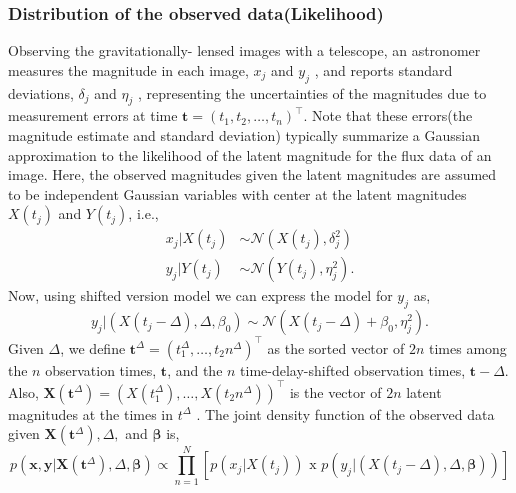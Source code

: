 \documentclass{article}
\begin{document}
\subsubsection*{Distribution of the observed data(Likelihood)}
Observing the gravitationally-
lensed images with a telescope, an astronomer measures the magnitude in
each image, $x_j$ and $y_j$ , and reports standard deviations, $\delta_j$ and $\eta_j$ , representing the uncertainties of the magnitudes due to measurement errors at time $\boldsymbol{t} = (t_1 , t_2, \ldots, t_n)^\top$. Note that these errors(the magnitude estimate and standard deviation) typically summarize a Gaussian approximation to the likelihood of the latent magnitude for the flux data of an image. Here, the observed magnitudes given the latent magnitudes are
assumed to be independent Gaussian variables with center at the latent magnitudes $X(t_j)$ and $Y (t_j )$, i.e.,
\begin{align*}
    x_j|X(t_j) & \sim \mathcal{N}(X(t_j),\delta_j^2)\\
    y_j|Y(t_j) & \sim \mathcal{N}(Y(t_j),\eta_j^2).
\end{align*}
Now, using shifted version model we can express the model for $y_j$ as,
\begin{equation*}
    y_j|(X(t_j-\Delta),\Delta,\beta_0) \sim \mathcal{N}(X(t_j-\Delta)+\beta_0,\eta_j^2).
\end{equation*}
Given $\Delta$, we define $\boldsymbol{t}^{\Delta} = (t_1^{\Delta},\ldots,t_2n^{\Delta})^\top$
 as the sorted vector of $2n$ times
among the $n$ observation times, $\boldsymbol{t}$, and the $n$ time-delay-shifted observation
times, $\boldsymbol{t} - \Delta$. Also, $\mathbf{X}(\boldsymbol{t}^{\Delta}) = (X(t_1^{\Delta}),\ldots, X(t_2n^{\Delta}))^\top$
 is the vector of
$2n$ latent magnitudes at the times in $t^{\Delta}$
. The joint density function of the
observed data given $\mathbf{X}(\boldsymbol{t}^{\Delta}), \Delta,$ and $\boldsymbol{\beta}$ is,
\begin{equation*}
    p(\boldsymbol{x},\boldsymbol{y}|\mathbf{X}(\boldsymbol{t}^{\Delta}), \Delta,\boldsymbol{\beta}) \propto \prod_{n=1}^N \left[p(x_j|X(t_j)) \text{ x } p(y_j|(X(t_j-\Delta),\Delta,\boldsymbol{\beta}))\right]
\end{equation*}
\end{document}
